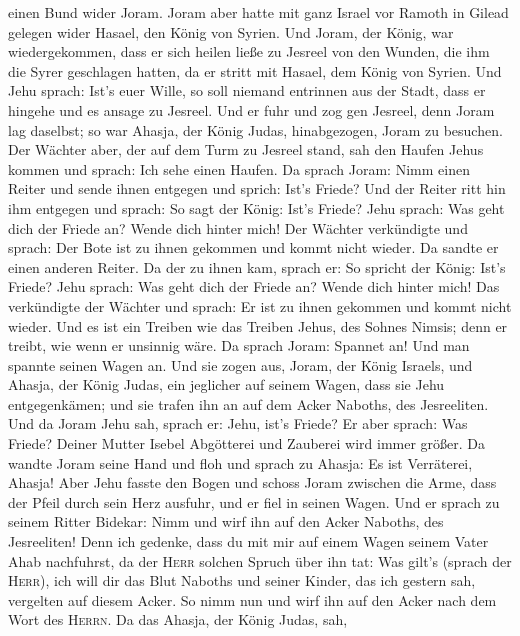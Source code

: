einen Bund wider Joram. Joram aber hatte mit ganz Israel vor Ramoth in
Gilead gelegen wider Hasael, den König von Syrien.  Und
Joram, der König, war wiedergekommen, dass er sich heilen ließe zu
Jesreel von den Wunden, die ihm die Syrer geschlagen hatten, da er
stritt mit Hasael, dem König von Syrien. Und Jehu sprach: Ist's euer
Wille, so soll niemand entrinnen aus der Stadt, dass er hingehe und es
ansage zu Jesreel.  Und er fuhr und zog gen Jesreel, denn
Joram lag daselbst; so war Ahasja, der König Judas, hinabgezogen, Joram
zu besuchen.  Der Wächter aber, der auf dem Turm zu
Jesreel stand, sah den Haufen Jehus kommen und sprach: Ich sehe einen
Haufen. Da sprach Joram: Nimm einen Reiter und sende ihnen entgegen und
sprich: Ist's Friede?  Und der Reiter ritt hin ihm
entgegen und sprach: So sagt der König: Ist's Friede? Jehu sprach: Was
geht dich der Friede an? Wende dich hinter mich! Der Wächter verkündigte
und sprach: Der Bote ist zu ihnen gekommen und kommt nicht wieder.
 Da sandte er einen anderen Reiter. Da der zu ihnen kam,
sprach er: So spricht der König: Ist's Friede? Jehu sprach: Was geht
dich der Friede an? Wende dich hinter mich!  Das
verkündigte der Wächter und sprach: Er ist zu ihnen gekommen und kommt
nicht wieder. Und es ist ein Treiben wie das Treiben Jehus, des Sohnes
Nimsis; denn er treibt, wie wenn er unsinnig wäre.  Da
sprach Joram: Spannet an! Und man spannte seinen Wagen an. Und sie zogen
aus, Joram, der König Israels, und Ahasja, der König Judas, ein
jeglicher auf seinem Wagen, dass sie Jehu entgegenkämen; und sie trafen
ihn an auf dem Acker Naboths, des Jesreeliten.  Und da
Joram Jehu sah, sprach er: Jehu, ist's Friede? Er aber sprach: Was
Friede? Deiner Mutter Isebel Abgötterei und Zauberei wird immer größer.
 Da wandte Joram seine Hand und floh und sprach zu
Ahasja: Es ist Verräterei, Ahasja!  Aber Jehu fasste den
Bogen und schoss Joram zwischen die Arme, dass der Pfeil durch sein Herz
ausfuhr, und er fiel in seinen Wagen.  Und er sprach zu
seinem Ritter Bidekar: Nimm und wirf ihn auf den Acker Naboths, des
Jesreeliten! Denn ich gedenke, dass du mit mir auf einem Wagen seinem
Vater Ahab nachfuhrst, da der \textsc{Herr} solchen Spruch über ihn tat:
 Was gilt's (sprach der \textsc{Herr}), ich will dir das
Blut Naboths und seiner Kinder, das ich gestern sah, vergelten auf
diesem Acker. So nimm nun und wirf ihn auf den Acker nach dem Wort des
\textsc{Herrn}.  Da das Ahasja, der König Judas, sah,
